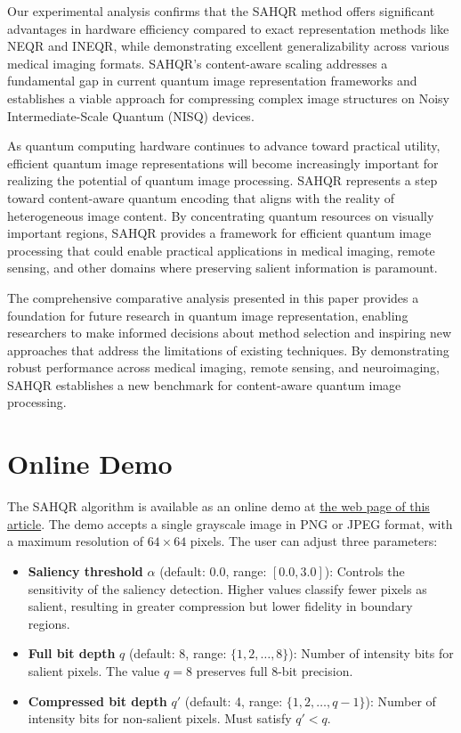 \documentclass{ipol}
\begin{document}
Our experimental analysis confirms that the SAHQR method offers significant advantages in hardware efficiency compared to exact representation methods like NEQR and INEQR, while demonstrating excellent generalizability across various medical imaging formats. SAHQR's content-aware scaling addresses a fundamental gap in current quantum image representation frameworks and establishes a viable approach for compressing complex image structures on Noisy Intermediate-Scale Quantum (NISQ) devices.

As quantum computing hardware continues to advance toward practical utility, efficient quantum image representations will become increasingly important for realizing the potential of quantum image processing. SAHQR represents a step toward content-aware quantum encoding that aligns with the reality of heterogeneous image content. By concentrating quantum resources on visually important regions, SAHQR provides a framework for efficient quantum image processing that could enable practical applications in medical imaging, remote sensing, and other domains where preserving salient information is paramount.

The comprehensive comparative analysis presented in this paper provides a foundation for future research in quantum image representation, enabling researchers to make informed decisions about method selection and inspiring new approaches that address the limitations of existing techniques. By demonstrating robust performance across medical imaging, remote sensing, and neuroimaging, SAHQR establishes a new benchmark for content-aware quantum image processing.



\section{Online Demo}
\label{sec:online_demo}

The SAHQR algorithm is available as an online demo at \href{\ipolLink}{the web page of this article}. The demo accepts a single grayscale image in PNG or JPEG format, with a maximum resolution of $64 \times 64$ pixels. The user can adjust three parameters:
\begin{itemize}
\item \textbf{Saliency threshold} $\alpha$ (default: 0.0, range: $[0.0, 3.0]$): Controls the sensitivity of the saliency detection. Higher values classify fewer pixels as salient, resulting in greater compression but lower fidelity in boundary regions.
\item \textbf{Full bit depth} $q$ (default: 8, range: $\{1, 2, \ldots{}, 8\}$): Number of intensity bits for salient pixels. The value $q=8$ preserves full 8-bit precision.
\item \textbf{Compressed bit depth} $q'$ (default: 4, range: $\{1, 2, \ldots{}, q-1\}$): Number of intensity bits for non-salient pixels. Must satisfy $q' < q$.
\end{itemize}
\end{document}
